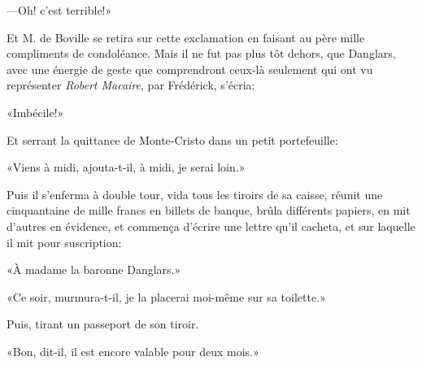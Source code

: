 —Oh! c'est terrible!» 

Et M. de Boville se retira sur cette exclamation en faisant au père mille compliments de condoléance. Mais il ne fut pas plus tôt dehors, que Danglars, avec une énergie de geste que comprendront ceux-là seulement qui ont vu représenter \textit{Robert Macaire}, par Frédérick, s'écria: 

«Imbécile!» 

Et serrant la quittance de Monte-Cristo dans un petit portefeuille: 

«Viens à midi, ajouta-t-il, à midi, je serai loin.» 

Puis il s'enferma à double tour, vida tous les tiroirs de sa caisse, réunit une cinquantaine de mille francs en billets de banque, brûla différents papiers, en mit d'autres en évidence, et commença d'écrire une lettre qu'il cacheta, et sur laquelle il mit pour suscription: 

«À madame la baronne Danglars.» 

«Ce soir, murmura-t-il, je la placerai moi-même sur sa toilette.» 

Puis, tirant un passeport de son tiroir. 

«Bon, dit-il, il est encore valable pour deux mois.» 